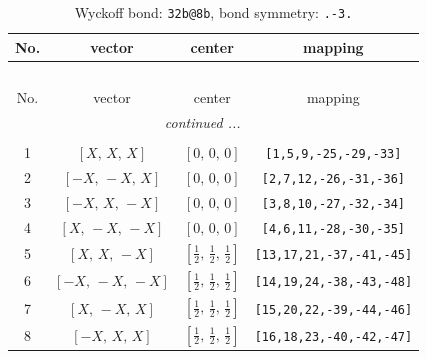 \documentclass[fleqn,8pt]{jsarticle}
\begin{document}
\begin{longtable}{cccc}
\caption{Wyckoff bond: {\tt 32b@8b}, bond symmetry: {\tt .-3.}}
 \\
 \hline \hline
No. & vector & center & mapping \\ \hline \endfirsthead

\multicolumn{3}{l}{\tablename\ \thetable{}} \\
 \hline \hline
No. & vector & center & mapping \\ \hline \endhead

 \hline \hline
\multicolumn{3}{r}{\footnotesize\it continued ...} \\ \endfoot

 \hline \hline
\multicolumn{3}{r}{} \\ \endlastfoot

1 & $\left[ X,\, X,\, X \right]$ & $\left[ 0,\, 0,\, 0 \right]$ & {\tt [1,5,9,-25,-29,-33]} \\ \hline
2 & $\left[ - X,\, - X,\, X \right]$ & $\left[ 0,\, 0,\, 0 \right]$ & {\tt [2,7,12,-26,-31,-36]} \\ \hline
3 & $\left[ - X,\, X,\, - X \right]$ & $\left[ 0,\, 0,\, 0 \right]$ & {\tt [3,8,10,-27,-32,-34]} \\ \hline
4 & $\left[ X,\, - X,\, - X \right]$ & $\left[ 0,\, 0,\, 0 \right]$ & {\tt [4,6,11,-28,-30,-35]} \\ \hline
5 & $\left[ X,\, X,\, - X \right]$ & $\left[ \frac{1}{2},\, \frac{1}{2},\, \frac{1}{2} \right]$ & {\tt [13,17,21,-37,-41,-45]} \\ \hline
6 & $\left[ - X,\, - X,\, - X \right]$ & $\left[ \frac{1}{2},\, \frac{1}{2},\, \frac{1}{2} \right]$ & {\tt [14,19,24,-38,-43,-48]} \\ \hline
7 & $\left[ X,\, - X,\, X \right]$ & $\left[ \frac{1}{2},\, \frac{1}{2},\, \frac{1}{2} \right]$ & {\tt [15,20,22,-39,-44,-46]} \\ \hline
8 & $\left[ - X,\, X,\, X \right]$ & $\left[ \frac{1}{2},\, \frac{1}{2},\, \frac{1}{2} \right]$ & {\tt [16,18,23,-40,-42,-47]} \\
\end{longtable}
\renewcommand{\arraystretch}{1.2}
\end{document}

